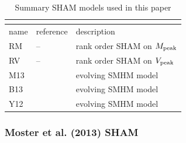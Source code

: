 \documentclass[useAMS,fleqn,usenatbib]{mnras}
\begin{document}
\begin{table}
\label{table:models}
\caption{Summary SHAM models used in this paper}
\begin{tabular}{ |p{0.55cm}|p{3cm}|p{3.65cm}}
\multicolumn{3}{|c|}{} \\
\hline
name & reference & description  \\
\hline
\hline
RM &  -- & rank order SHAM on $M_{\rm peak}$ \\
RV & -- & rank order SHAM on $V_{\rm peak}$ \\
M13 & \citet{Moster:2013ab} & evolving SMHM model \\
B13 & \citet{Behroozi:2013fg} & evolving SMHM model \\
Y12 & \citet{Yang:2012ew} & evolving SMHM model \\
\hline
\end{tabular}
\end{table}

\subsubsection{Moster et al. (2013) SHAM}
\label{sec:m13}
\end{document}
